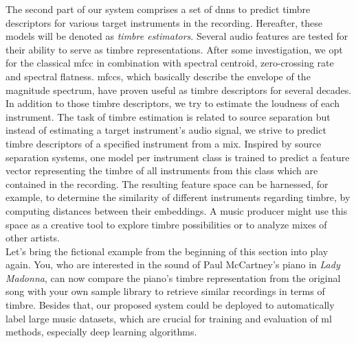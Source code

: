 The second part of our system comprises a set of \glspl{dnn} to predict timbre descriptors for various target instruments in the recording. Hereafter, these models will be denoted as \textit{timbre estimators}. Several audio features are tested for their ability to serve as timbre representations. After some investigation, we opt for the classical \gls{mfcc} in combination with spectral centroid, zero-crossing rate and spectral flatness. \Glspl{mfcc}, which basically describe the envelope of the magnitude spectrum, have proven useful as timbre descriptors for several decades. In addition to those timbre descriptors, we try to estimate the loudness of each instrument. The task of timbre estimation is related to source separation but instead of estimating a target instrument's audio signal, we strive to predict timbre descriptors of a specified instrument from a mix. Inspired by source separation systems, one model per instrument class is trained to predict a feature vector representing the timbre of all instruments from this class which are contained in the recording. The resulting feature space can be harnessed, for example, to determine the similarity of different instruments regarding timbre, by computing distances between their embeddings. A music producer might use this space as a creative tool to explore timbre possibilities or to analyze mixes of other artists.\\

Let's bring the fictional example from the beginning of this section into play again. You, who are interested in the sound of Paul McCartney's piano in \textit{Lady Madonna}, can now compare the piano's timbre representation from the original song with your own sample library to retrieve similar recordings in terms of timbre. Besides that, our proposed system could be deployed to automatically label large music datasets, which are crucial for training and evaluation of \gls{ml} methods, especially deep learning algorithms.


